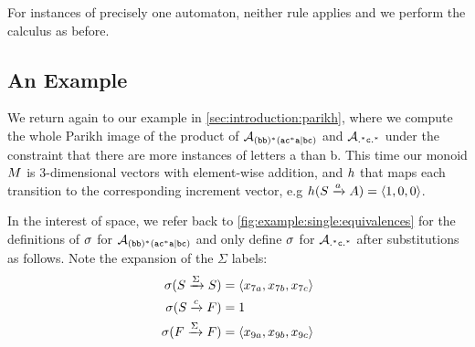 \iffalse
Note that this definition implies that $\Filter(\Transition) =
\Filter(\Transition')$ whenever two transitions $\Transition \in
\Transitions_{\Automaton_1}, \Transition' \in \Transitions_{\Automaton_2}$
produces a product transition $\Transition'' \in \Transitions_{\Automaton_1
\times \Automaton_2}$. This corresponds to our intuition that the terms of the
product must agree on the value they accept. As before, we implicitly map
$\Filter$ to fresh terms for each transition in the product.
\fi

For instances of precisely one automaton, neither rule applies and we
perform the calculus as before.

\subsection{An Example}\label{sec:multiple:example}

We return again to our example in \cref{sec:introduction:parikh}, where we
compute the whole Parikh image of the product of $\mathcal{A}_{\mathtt{(bb)^\ast(ac^\ast{}a|bc)}}{}$ and
$\mathcal{A}_{\mathtt{.^\ast{}c.^\ast}}$ under the constraint that there are more instances of
letters a than b. This time our monoid $M$ is 3-dimensional vectors with
element-wise addition, and $h$ that maps each transition to the corresponding
increment vector, e.g $h(S \xrightarrow{a} A) = \left\langle1,0,0\right\rangle$.


In the interest of space, we refer back to
\cref{fig:example:single:equivalences} for the definitions of $\Filter$ for
$\mathcal{A}_{\mathtt{(bb)^\ast(ac^\ast{}a|bc)}}$ and only define $\Filter$ for $\mathcal{A}_{\mathtt{.^\ast{}c.^\ast}}{}$ after
substitutions as follows. Note the expansion of the $\Sigma$ labels:
    \begin{equation*}
      \begin{aligned}
        \operatorname{\sigma}(S \xrightarrow{\Sigma} S) & = \left\langle x_{7a}, x_{7b}, x_{7c}\right\rangle \\
        \operatorname{\sigma}(S \xrightarrow{c} F) & = 1 \\
        \operatorname{\sigma}(F \xrightarrow{\Sigma} F) & = \left\langle x_{9a}, x_{9b}, x_{9c}\right\rangle \\
      \end{aligned}
    \end{equation*}
    
